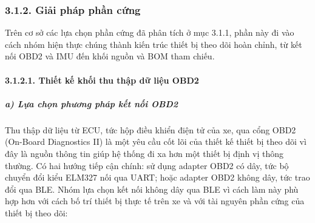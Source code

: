 \documentclass[a4paper]{extarticle}
\begin{document}
\subsubsection{3.1.2. Giải pháp phần
cứng}\label{321-giux1ea3i-phuxe1p-phux1ea7n-cux1ee9ng}

Trên cơ sở các lựa chọn phần cứng đã phân tích ở mục 3.1.1, phần này đi
vào cách nhóm hiện thực chúng thành kiến trúc thiết bị theo dõi hoàn chỉnh, từ
kết nối OBD2 và IMU đến khối nguồn và BOM tham chiếu.

\paragraph{3.1.2.1. Thiết kế khối thu thập dữ liệu
OBD2}\label{3211-thiux1ebft-kux1ebf-muxf4-ux111un-thu-thux1eadp-dux1eef-liux1ec7u-obd2}

\subparagraph{a) Lựa chọn phương pháp kết nối
OBD2}\label{a-lux1ef1a-chux1ecdn-phux1b0ux1a1ng-phuxe1p-kux1ebft-nux1ed1i-obd2}

Thu thập dữ liệu từ ECU, tức hộp điều khiển điện tử của xe, qua cổng OBD2
(On-Board Diagnostics II) là một yêu cầu cốt lõi của thiết kế thiết bị theo dõi vì
đây là nguồn thông tin giúp hệ thống đi xa hơn một thiết bị định vị
thông thường. Có hai hướng tiếp cận chính: sử dụng adapter OBD2 có dây,
tức bộ chuyển đổi kiểu ELM327 nối qua UART; hoặc adapter OBD2 không dây,
tức trao đổi qua BLE. Nhóm lựa chọn kết nối không dây qua BLE vì cách
làm này phù hợp hơn với cách bố trí thiết bị thực tế trên xe và với tài
nguyên phần cứng của thiết bị theo dõi:
\end{document}
